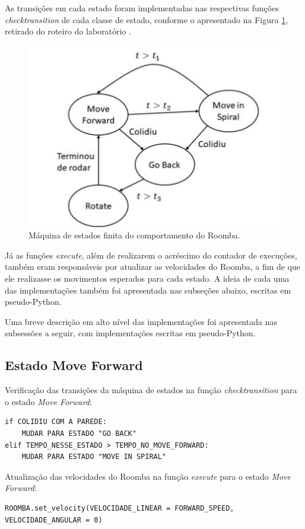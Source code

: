 \documentclass[conference]{IEEEtran}
\begin{document}
As transições em cada estado foram implementadas nas respectivas funções \textit{check\underline{\space}transition} de cada classe de estado, conforme o apresentado na Figura \ref{state_machine}, retirado do roteiro do laboratório \cite{b1}.

\begin{figure}[htbp]
\centerline{\includegraphics[scale=0.4]{maquina_estados.png}}
\caption{Máquina de estados finita do comportamento do Roomba.}
\label{state_machine}
\end{figure}

Já as funções \textit{execute}, além de realizarem o acréscimo do contador de execuções, também eram responsáveis por atualizar as velocidades do Roomba, a fim de que ele realizasse os movimentos esperados para cada estado. A ideia de cada uma das implementações também foi apresentada nas subseções abaixo, escritas em pseudo-Python.

Uma breve descrição em alto nível das implementações foi apresentada nas subsessões a seguir, com implementações escritas em pseudo-Python.

\subsection{Estado Move Forward}
Verificação das transições da máquina de estados na função \textit{check\underline{\space}transition} para o estado \textit{Move Forward}:
\begin{lstlisting}
if COLIDIU COM A PAREDE:
	MUDAR PARA ESTADO "GO BACK"
elif TEMPO_NESSE_ESTADO > TEMPO_NO_MOVE_FORWARD:
	MUDAR PARA ESTADO "MOVE IN SPIRAL"
\end{lstlisting}

Atualização das velocidades do Roomba na função \textit{execute} para o estado \textit{Move Forward}:
\begin{lstlisting}
ROOMBA.set_velocity(VELOCIDADE_LINEAR = FORWARD_SPEED, VELOCIDADE_ANGULAR = 0)
\end{lstlisting}
\end{document}
